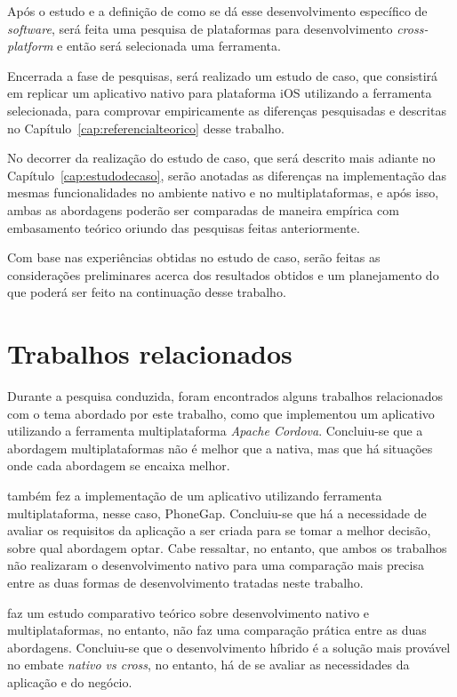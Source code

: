 Após o estudo e a definição de como se dá esse desenvolvimento específico de \textit{software},
será feita uma pesquisa de plataformas para desenvolvimento \textit{cross-platform} e então será selecionada uma ferramenta. 

Encerrada a fase de pesquisas, será realizado um estudo de caso, que consistirá em replicar um aplicativo nativo para plataforma iOS utilizando a ferramenta selecionada, 
para comprovar empiricamente as diferenças pesquisadas e descritas no Capítulo~\ref{cap:referencialteorico} desse trabalho.

No decorrer da realização do estudo de caso, que será descrito mais adiante no 
Capítulo~\ref{cap:estudodecaso}, serão anotadas as diferenças na implementação das mesmas funcionalidades no ambiente nativo e no multiplataformas, e após isso, ambas as abordagens poderão ser comparadas
de maneira empírica com embasamento teórico oriundo das pesquisas feitas anteriormente.

Com base nas experiências obtidas no estudo de caso, serão feitas as considerações preliminares acerca dos resultados obtidos e um planejamento do que poderá ser feito na continuação desse trabalho.

\section{Trabalhos relacionados} \label{sec:trabalhosrelacionados}

Durante a pesquisa conduzida, foram encontrados alguns trabalhos relacionados com o tema abordado por este trabalho, como 
que implementou um aplicativo utilizando a ferramenta multiplataforma \textit{Apache Cordova}. Concluiu-se que a abordagem multiplataformas 
não é melhor que a nativa, mas que há situações onde cada abordagem se encaixa melhor.

 também fez a implementação de um aplicativo utilizando ferramenta multiplataforma, nesse caso, PhoneGap. 
Concluiu-se que há a necessidade de avaliar os requisitos da aplicação a ser criada para se tomar a melhor decisão, sobre qual abordagem optar.
Cabe ressaltar, no entanto, que ambos os trabalhos não realizaram o desenvolvimento nativo para uma comparação mais precisa entre as duas formas de desenvolvimento
tratadas neste trabalho. 

 faz um estudo comparativo teórico sobre desenvolvimento nativo e multiplataformas, no entanto,
não faz uma comparação prática entre as duas abordagens. Concluiu-se que o desenvolvimento híbrido é a solução mais provável no embate 
\textit{nativo vs cross}, no entanto, há de se avaliar as necessidades da aplicação e do negócio.

